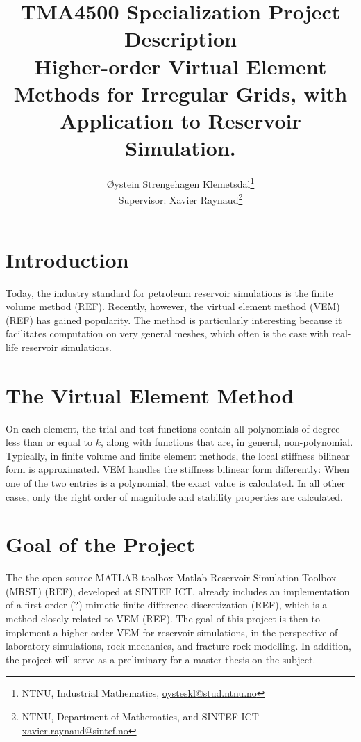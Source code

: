\documentclass[a4paper,english, final, 11pt]{article}
\title{TMA4500 Specialization Project Description \\
\textbf{Higher-order Virtual Element Methods for Irregular Grids, with Application to Reservoir Simulation.}}
\author{Øystein Strengehagen Klemetsdal\thanks{%
NTNU, Industrial Mathematics, %
\href{mailto:oysteskl@stud.ntnu.no}{oysteskl@stud.ntnu.no}} \\
Supervisor: Xavier Raynaud\thanks{%
NTNU, Department of Mathematics, and SINTEF ICT %
\href{mailto:xavier.raynaud@sintef.no}{xavier.raynaud@sintef.no}}}
\begin{document}
\maketitle

\section{Introduction}
%
Today, the industry standard for petroleum reservoir simulations is the finite volume method
(REF). Recently, however, the virtual element method (VEM) (REF) has gained popularity. The method is
particularly interesting because it facilitates computation on very general meshes, which often is the case
with real-life reservoir simulations.

\section{The Virtual Element Method}
%
On each element, the trial and test functions contain all polynomials
of degree less than or equal to $k$, along with functions that are, in general, non-polynomial. Typically,
in finite volume and finite element methods, the local stiffness bilinear form is approximated.
VEM handles the stiffness bilinear form differently: When one of the two entries is a polynomial, the exact
value is calculated. In all other cases, only the right order of magnitude and stability properties are
calculated.

\section{Goal of the Project}
%
The the open-source MATLAB toolbox Matlab Reservoir Simulation Toolbox (MRST) (REF), developed at SINTEF ICT,
already includes an implementation of a first-order (?) mimetic finite difference discretization (REF),
which is a method closely related to VEM (REF). The goal of this project is then to implement a higher-order
VEM for reservoir simulations, in the perspective of laboratory simulations, rock mechanics, and fracture
rock modelling. In addition, the project will serve as a preliminary for a master thesis on the subject. 
\end{document}
